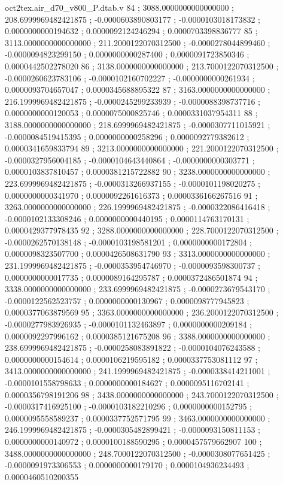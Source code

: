 \begin{filecontents}[overwrite]{oct2tex.air_d70_v800_P.dtab.v}
84 ; 3088.0000000000000000 ; 208.6999969482421875 ; -0.0000603890803177 ; -0.0000103018173832 ; 0.0000000000194632 ; 0.0000092124246294 ; 0.0000703398836777
85 ; 3113.0000000000000000 ; 211.2000122070312500 ; -0.0000278044899460 ; -0.0000094823299150 ; 0.0000000000287400 ; 0.0000091723850346 ; 0.0000442502278020
86 ; 3138.0000000000000000 ; 213.7000122070312500 ; -0.0000260623783106 ; -0.0000102160702227 ; -0.0000000000261934 ; 0.0000093704657047 ; 0.0000345688895322
87 ; 3163.0000000000000000 ; 216.1999969482421875 ; -0.0000245299233939 ; -0.0000088398737716 ; 0.0000000000120053 ; 0.0000075000825746 ; 0.0000331037954311
88 ; 3188.0000000000000000 ; 218.6999969482421875 ; -0.0000307711015921 ; -0.0000084519415395 ; 0.0000000000258296 ; 0.0000092779382612 ; 0.0000341659833794
89 ; 3213.0000000000000000 ; 221.2000122070312500 ; -0.0000327956004185 ; -0.0000104643440864 ; -0.0000000000303771 ; 0.0000103837810457 ; 0.0000381215722882
90 ; 3238.0000000000000000 ; 223.6999969482421875 ; -0.0000313266937155 ; -0.0000101198020275 ; 0.0000000000341970 ; 0.0000092261616373 ; 0.0000336166267516
91 ; 3263.0000000000000000 ; 226.1999969482421875 ; -0.0000322086416418 ; -0.0000102133308246 ; 0.0000000000440195 ; 0.0000114763170131 ; 0.0000429377978435
92 ; 3288.0000000000000000 ; 228.7000122070312500 ; -0.0000262570138148 ; -0.0000103198581201 ; 0.0000000000172804 ; 0.0000098323507700 ; 0.0000426508631790
93 ; 3313.0000000000000000 ; 231.1999969482421875 ; -0.0000353954746970 ; -0.0000093598300737 ; 0.0000000000017735 ; 0.0000089164295787 ; 0.0000372486501874
94 ; 3338.0000000000000000 ; 233.6999969482421875 ; -0.0000273679543170 ; -0.0000122562523757 ; 0.0000000000130967 ; 0.0000098777945823 ; 0.0000377063879569
95 ; 3363.0000000000000000 ; 236.2000122070312500 ; -0.0000277983926935 ; -0.0000101132463897 ; 0.0000000000209184 ; 0.0000092297996162 ; 0.0000385121675208
96 ; 3388.0000000000000000 ; 238.6999969482421875 ; -0.0000258083891822 ; -0.0000104076243588 ; 0.0000000000154614 ; 0.0000106219595182 ; 0.0000337753081112
97 ; 3413.0000000000000000 ; 241.1999969482421875 ; -0.0000338414211001 ; -0.0000101558798633 ; 0.0000000000184627 ; 0.0000095116702141 ; 0.0000356798191206
98 ; 3438.0000000000000000 ; 243.7000122070312500 ; -0.0000317416925100 ; -0.0000103182210296 ; 0.0000000000152795 ; 0.0000095558589237 ; 0.0000337752571795
99 ; 3463.0000000000000000 ; 246.1999969482421875 ; -0.0000305482899421 ; -0.0000093150811153 ; 0.0000000000140972 ; 0.0000100188590295 ; 0.0000457579662907
100 ; 3488.0000000000000000 ; 248.7000122070312500 ; -0.0000308077651425 ; -0.0000091973306553 ; 0.0000000000179170 ; 0.0000104936234493 ; 0.0000460510200355

\end{filecontents}
